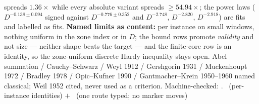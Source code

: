 spreads $1.36\times$ while every absolute variant spreads $\ge54.94\times$; the
power laws ($D^{-0.138\pm0.094}$ signed against $D^{-0.776\pm0.352}$ and
$D^{-2.748}$, $D^{-2.820}$, $D^{-2.918}$) are fits and labelled as fits.
\textbf{Named limits as content:} per instance on small windows, nothing uniform
in the zone index or in $D$; the bound rows promote \emph{validity} and not size
--- neither shape beats the target --- and the finite-core row is an identity, so
the zone-uniform discrete Hardy inequality stays open.
Abel summation / Cauchy--Schwarz / Weyl 1912 / Gershgorin 1931 / Muckenhoupt 1972
/ Bradley 1978 / Opic--Kufner 1990 / Gantmacher--Krein 1950--1960 named classical;
Weil 1952 cited, never used as a criterion.
Machine-checked:
.
\mE\ (per-instance identities) $+$ \mX\ (one route typed; no marker moves)



